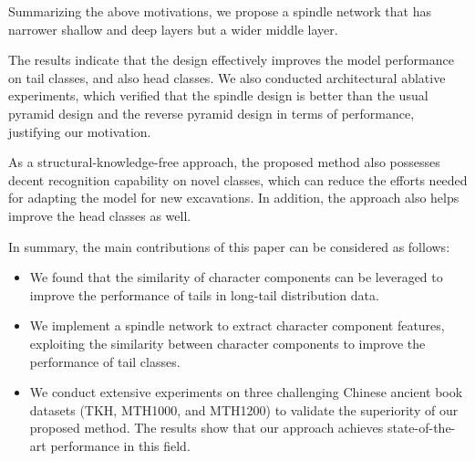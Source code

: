 Summarizing the above motivations, we propose a spindle network that has narrower shallow and deep layers but a wider middle layer. 

The results indicate that the design effectively improves the model performance on tail classes, and also head classes.  
We also conducted architectural ablative experiments, which verified that the spindle design is better than the usual pyramid design and the reverse pyramid design in terms of performance, justifying our motivation.

As a structural-knowledge-free approach, the proposed method also possesses decent recognition capability on novel classes, which can reduce the efforts needed for adapting the model for new excavations. In addition, the approach also helps improve the head classes as well. 

In summary, the main contributions of this paper can be considered as follows:
\begin{itemize}
\item We found that the similarity of character components can be leveraged to improve the performance of tails in long-tail distribution data.
\item We implement a spindle network to extract character component features, exploiting the similarity between character components to improve the performance of tail classes.
\item We conduct extensive experiments on three challenging Chinese ancient book datasets (TKH, MTH1000, and MTH1200) to validate the superiority of our proposed method. The results show that our approach achieves state-of-the-art performance in this field.
\end{itemize}
